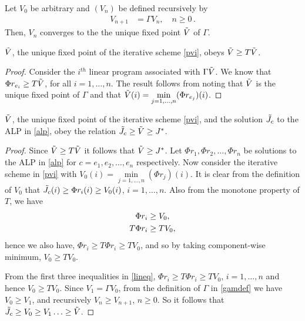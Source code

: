 \begin{corollary}
Let $V_0$ be arbitrary and $(V_n)$ be defined recursively by
\begin{align}\label{pvi}
V_{n+1}&=\Gamma V_n, \quad n\geq 0\,.
\end{align}
Then, $V_n$ converges to the the unique fixed point $\tilde{V}$ of $\Gamma$.
\end{corollary}
\begin{lemma}\label{gfp}
 $\tilde{V}$, the unique fixed point of the iterative scheme \eqref{pvi}, obeys $\tilde{V}\geq T\tilde{V}$.
\end{lemma}
\begin{proof}
Consider the $i^{th}$ linear program associated with $\Gamma \tilde{V}$. We know that $\Phi r_{e_i}\geq T \tilde{V}$, for all $i=1,\ldots, n$. The result follows from noting that $\tilde{V}$ is the unique fixed point of $\Gamma $ and that $\tilde{V}(i)=\underset{j=1,\ldots,n}{\min}(\Phi r_{e_j})(i)$.
\end{proof}
\begin{lemma}\label{relation1}
 $\tilde{V}$, the unique fixed point of the iterative scheme \eqref{pvi}, and the solution $\tilde{J}_c$ to the ALP in \eqref{alp}, obey the relation $\tilde{J}_c\geq\tilde{V}\geq J^*$.
\end{lemma}
\begin{proof}
Since $\tilde{V}\geq T\tilde{V}$ it follows that $\tilde{V}\geq J^*$. Let $\Phi r_1, \Phi r_2,\ldots,\Phi r_n$ be solutions to the ALP in \eqref{alp} for $c=e_1, e_2,\ldots,e_n$ respectively. Now consider the iterative scheme in \eqref{pvi} with $V_0(i)=\underset{j=1,\ldots, n}{\min}(\Phi r_j)(i)$. It is clear from the definition of $V_0$ that $\tilde{J}_c(i)\geq\Phi r_i(i)\geq V_0(i)$, $i=1,\ldots,n$. Also from the monotone property of $T$, we have 
\begin{align}\label{lineq}
\Phi r_i&\geq V_0,\nn\\
T\Phi r_i&\geq T V_0,\nn
\end{align}
hence we also have,
$\Phi r_i\geq T\Phi r_i \geq T V_0$, 
and so by taking component-wise minimum,
$V_0 \geq T V_0$.

From the first three inequalities in \eqref{lineq}, $\Phi r_i\geq T \Phi r_i\geq T V_0$, $i=1,\dots, n$ and hence $V_0\geq TV_0$. Since $V_1=\Gamma V_0$, from the definition of $\Gamma$ in \eqref{gamdef} we have $V_0\geq V_1$, and recursively $V_{n}\geq V_{n+1}$, $n\geq 0$. So it follows that $\tilde{J}_c\geq V_0\geq V_1\ldots\geq \tilde{V}$.
\end{proof}

